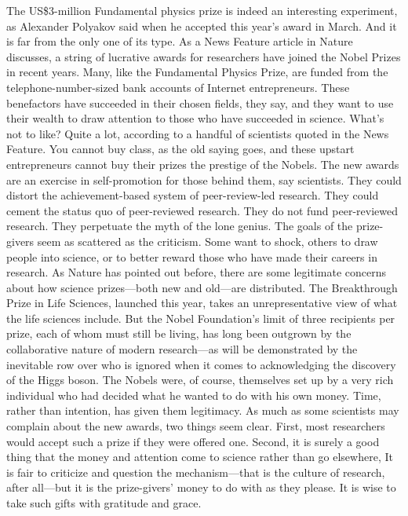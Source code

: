 The US\$3-million Fundamental physics prize is indeed an interesting experiment, as Alexander Polyakov said when he accepted this year’s award in March. And it is far from the only one of its type. As a News Feature article in Nature discusses, a string of lucrative awards for researchers have joined the Nobel Prizes in recent years. Many, like the Fundamental Physics Prize, are funded from the telephone-number-sized bank accounts of Internet entrepreneurs. These benefactors have succeeded in their chosen fields, they say, and they want to use their wealth to draw attention to those who have succeeded in science.
What’s not to like? Quite a lot, according to a handful of scientists quoted in the News Feature. You cannot buy class, as the old saying goes, and these upstart entrepreneurs cannot buy their prizes the prestige of the Nobels. The new awards are an exercise in self-promotion for those behind them, say scientists. They could distort the achievement-based system of peer-review-led research. They could cement the status quo of peer-reviewed research. They do not fund peer-reviewed research. They perpetuate the myth of the lone genius.
The goals of the prize-givers seem as scattered as the criticism. Some want to shock, others to draw people into science, or to better reward those who have made their careers in research.
As Nature has pointed out before, there are some legitimate concerns about how science prizes—both new and old—are distributed. The Breakthrough Prize in Life Sciences, launched this year, takes an unrepresentative view of what the life sciences include. But the Nobel Foundation’s limit of three recipients per prize, each of whom must still be living, has long been outgrown by the collaborative nature of modern research—as will be demonstrated by the inevitable row over who is ignored when it comes to acknowledging the discovery of the Higgs boson. The Nobels were, of course, themselves set up by a very rich individual who had decided what he wanted to do with his own money. Time, rather than intention, has given them legitimacy.
As much as some scientists may complain about the new awards, two things seem clear. First, most researchers would accept such a prize if they were offered one. Second, it is surely a good thing that the money and attention come to science rather than go elsewhere, It is fair to criticize and question the mechanism—that is the culture of research, after all—but it is the prize-givers’ money to do with as they please. It is wise to take such gifts with gratitude and grace.
